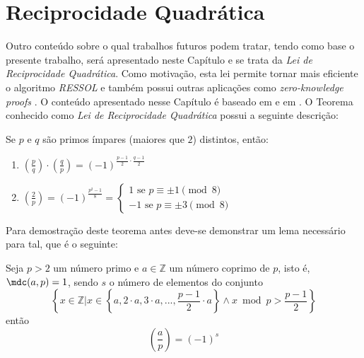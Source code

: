 \chapter{Reciprocidade Quadrática}
\label{cap:reciprocidadequadratica}

Outro conteúdo sobre o qual trabalhos futuros podem tratar, tendo como base o presente trabalho, será apresentado neste Capítulo e se trata da \textit{Lei de Reciprocidade Quadrática}. Como motivação, esta lei permite tornar mais eficiente o algoritmo \textit{RESSOL} \cite{johndcookQuadraticReciprocity} e também possui outras aplicações como \textit{zero-knowledge proofs} \cite{Wright2016}. O conteúdo apresentado nesse Capítulo é baseado em \cite[p.~89-93]{book:2399854} e em \cite{youtuQuadraticReciprocity}.
O Teorema conhecido como \textit{Lei de Reciprocidade Quadrática} possui a seguinte descrição:

\begin{teorema} Se $p$ e $q$ são primos ímpares (maiores que $2$) distintos, então:
\label{teorema:reciprocidadequad}
    \begin{enumerate}
        \item \label{item:recipquad1} $\left(\frac{p}{q} \right) \cdot \left(\frac{q}{p} \right) = (-1)^{\frac{p-1}{2} \cdot \frac{q-1}{2}}$

        \item \label{item:recipquad2} $\left(\frac{2}{p} \right) = (-1)^{\frac{p^2 - 1}{8}} = \begin{cases}
                1 \text{ se $p \equiv \pm 1 \pmod{8}$}
                \\
                -1 \text{ se $p \equiv \pm 3 \pmod{8}$}
                \end{cases}$
    \end{enumerate}
    
\end{teorema}
Para demostração deste teorema antes deve-se demonstrar um lema necessário para tal, que é o seguinte:

\begin{lema} \label{lema:gauB}  Seja $p > 2$ um número primo e $a \in \mathbb{Z}$ um número coprimo de $p$, isto é, $\mdc(a, p) = 1$, sendo $s$ o número de elementos do conjunto
\begin{equation*}
    \left\{x \in \mathbb{Z} | x \in \left\{a, 2 \cdot a, 3 \cdot a, ..., \frac{p-1}{2} \cdot a\right\} \land x \bmod p > \frac{p-1}{2} \right\}
\end{equation*}
então
\begin{equation*}
    \left(\frac{a}{p}\right) = (-1)^s
\end{equation*}

\end{lema}

